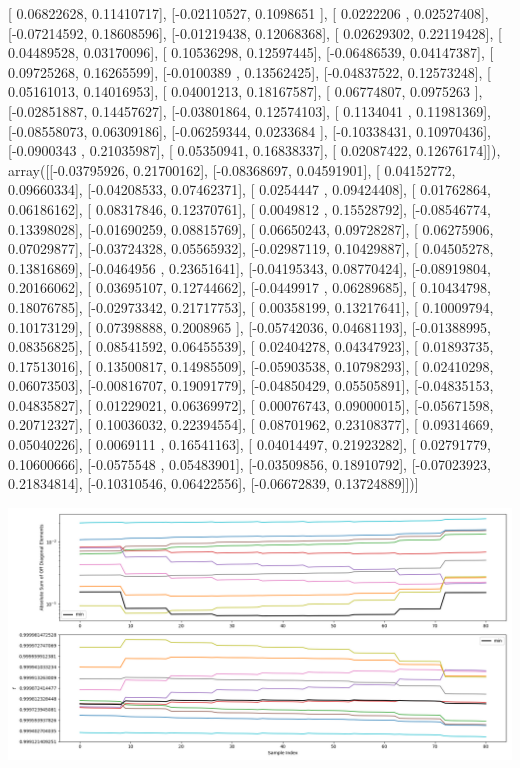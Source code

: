\documentclass{article}
\begin{document}
       [ 0.06822628,  0.11410717],
       [-0.02110527,  0.1098651 ],
       [ 0.0222206 ,  0.02527408],
       [-0.07214592,  0.18608596],
       [-0.01219438,  0.12068368],
       [ 0.02629302,  0.22119428],
       [ 0.04489528,  0.03170096],
       [ 0.10536298,  0.12597445],
       [-0.06486539,  0.04147387],
       [ 0.09725268,  0.16265599],
       [-0.0100389 ,  0.13562425],
       [-0.04837522,  0.12573248],
       [ 0.05161013,  0.14016953],
       [ 0.04001213,  0.18167587],
       [ 0.06774807,  0.0975263 ],
       [-0.02851887,  0.14457627],
       [-0.03801864,  0.12574103],
       [ 0.1134041 ,  0.11981369],
       [-0.08558073,  0.06309186],
       [-0.06259344,  0.0233684 ],
       [-0.10338431,  0.10970436],
       [-0.0900343 ,  0.21035987],
       [ 0.05350941,  0.16838337],
       [ 0.02087422,  0.12676174]]), array([[-0.03795926,  0.21700162],
       [-0.08368697,  0.04591901],
       [ 0.04152772,  0.09660334],
       [-0.04208533,  0.07462371],
       [ 0.0254447 ,  0.09424408],
       [ 0.01762864,  0.06186162],
       [ 0.08317846,  0.12370761],
       [ 0.0049812 ,  0.15528792],
       [-0.08546774,  0.13398028],
       [-0.01690259,  0.08815769],
       [ 0.06650243,  0.09728287],
       [ 0.06275906,  0.07029877],
       [-0.03724328,  0.05565932],
       [-0.02987119,  0.10429887],
       [ 0.04505278,  0.13816869],
       [-0.0464956 ,  0.23651641],
       [-0.04195343,  0.08770424],
       [-0.08919804,  0.20166062],
       [ 0.03695107,  0.12744662],
       [-0.0449917 ,  0.06289685],
       [ 0.10434798,  0.18076785],
       [-0.02973342,  0.21717753],
       [ 0.00358199,  0.13217641],
       [ 0.10009794,  0.10173129],
       [ 0.07398888,  0.2008965 ],
       [-0.05742036,  0.04681193],
       [-0.01388995,  0.08356825],
       [ 0.08541592,  0.06455539],
       [ 0.02404278,  0.04347923],
       [ 0.01893735,  0.17513016],
       [ 0.13500817,  0.14985509],
       [-0.05903538,  0.10798293],
       [ 0.02410298,  0.06073503],
       [-0.00816707,  0.19091779],
       [-0.04850429,  0.05505891],
       [-0.04835153,  0.04835827],
       [ 0.01229021,  0.06369972],
       [ 0.00076743,  0.09000015],
       [-0.05671598,  0.20712327],
       [ 0.10036032,  0.22394554],
       [ 0.08701962,  0.23108377],
       [ 0.09314669,  0.05040226],
       [ 0.0069111 ,  0.16541163],
       [ 0.04014497,  0.21923282],
       [ 0.02791779,  0.10600666],
       [-0.0575548 ,  0.05483901],
       [-0.03509856,  0.18910792],
       [-0.07023923,  0.21834814],
       [-0.10310546,  0.06422556],
       [-0.06672839,  0.13724889]])]
\begin{center}
\includegraphics[scale=.9]{report_pickled_controls161/control_dpn_all.png}

\end{center}
\end{document}
